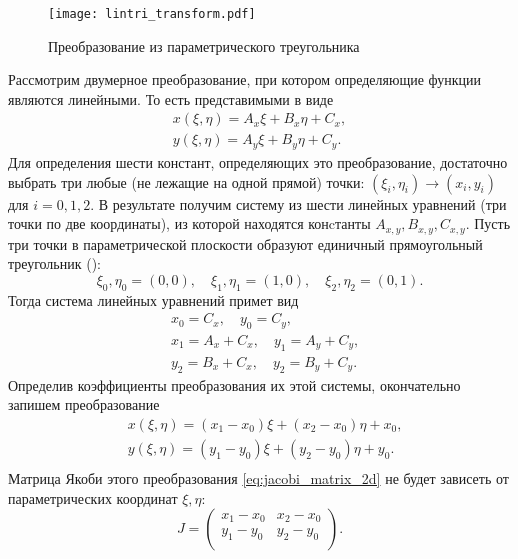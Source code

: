 \label{sec:lintri_transform}
\begin{figure}[h!]
\centering
\texttt{[image: lintri\_transform.pdf]}
\caption{Преобразование из параметрического треугольника}
\label{fig:lintri_transform}
\end{figure}
Рассмотрим двумерное преобразование, при котором
определяющие функции являются линейными. То есть представимыми в виде
\begin{align*}
x(\xi, \eta) = A_x \xi + B_x \eta + C_x, \\
y(\xi, \eta) = A_y \xi + B_y \eta + C_y.
\end{align*}
Для определения шести констант, определяющих это преобразование,
достаточно выбрать три любые (не лежащие на одной прямой) точки:
$(\xi_i, \eta_i) \to (x_i, y_i)$ для $i=0,1,2$.
В результате получим систему из шести линейных уравнений (три точки по две координаты),
из которой находятся конcтанты $A_{x,y}, B_{x,y}, C_{x,y}$.
Пусть три точки в параметрической плоскости
образуют единичный прямоугольный треугольник ():
\begin{equation*}
\xi_0, \eta_0 = (0, 0),\quad
\xi_1, \eta_1 = (1, 0),\quad
\xi_2, \eta_2 = (0, 1).
\end{equation*}
Тогда система линейных уравнений примет вид
\begin{align*}
&x_0 = C_x,       \quad y_0 = C_y, \\
&x_1 = A_x + C_x, \quad y_1 = A_y + C_y, \\
&y_2 = B_x + C_x, \quad y_2 = B_y + C_y.
\end{align*}
Определив коэффициенты преобразования их этой системы, окончательно запишем преобразование
\begin{equation}
\label{eq:lintri_transform}
\begin{aligned}
&x(\xi, \eta) = (x_1 - x_0)\xi + (x_2 - x_0) \eta + x_0,\\
&y(\xi, \eta) = (y_1 - y_0)\xi + (y_2 - y_0) \eta + y_0.\\
\end{aligned}
\end{equation}
Матрица Якоби этого преобразования \cref{eq:jacobi_matrix_2d}
не будет зависеть от параметрических координат $\xi, \eta$:
\begin{equation}
\label{eq:lintri_jacobi_matrix}
J = \left(
\begin{array}{cc}
x_1 - x_0 & x_2 - x_0 \\
y_1 - y_0 & y_2 - y_0 \\
\end{array}
\right).
\end{equation}
